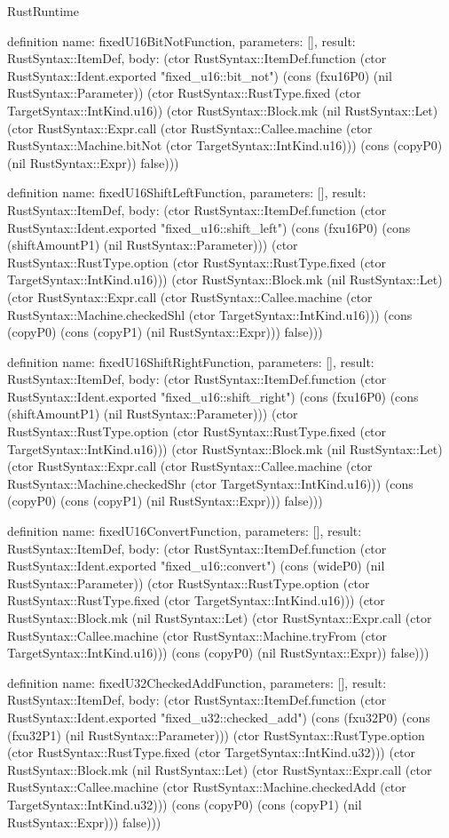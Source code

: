 \begin{lexlean}{RustRuntime}
\begin{semanticmodule}
definition{
  name: fixedU16BitNotFunction,
  parameters: [],
  result: RustSyntax::ItemDef,
  body: (ctor RustSyntax::ItemDef.function (ctor RustSyntax::Ident.exported "fixed_u16::bit_not") (cons (fxu16P0) (nil RustSyntax::Parameter)) (ctor RustSyntax::RustType.fixed (ctor TargetSyntax::IntKind.u16)) (ctor RustSyntax::Block.mk (nil RustSyntax::Let) (ctor RustSyntax::Expr.call (ctor RustSyntax::Callee.machine (ctor RustSyntax::Machine.bitNot (ctor TargetSyntax::IntKind.u16))) (cons (copyP0) (nil RustSyntax::Expr)) false)))
}

definition{
  name: fixedU16ShiftLeftFunction,
  parameters: [],
  result: RustSyntax::ItemDef,
  body: (ctor RustSyntax::ItemDef.function (ctor RustSyntax::Ident.exported "fixed_u16::shift_left") (cons (fxu16P0) (cons (shiftAmountP1) (nil RustSyntax::Parameter))) (ctor RustSyntax::RustType.option (ctor RustSyntax::RustType.fixed (ctor TargetSyntax::IntKind.u16))) (ctor RustSyntax::Block.mk (nil RustSyntax::Let) (ctor RustSyntax::Expr.call (ctor RustSyntax::Callee.machine (ctor RustSyntax::Machine.checkedShl (ctor TargetSyntax::IntKind.u16))) (cons (copyP0) (cons (copyP1) (nil RustSyntax::Expr))) false)))
}

definition{
  name: fixedU16ShiftRightFunction,
  parameters: [],
  result: RustSyntax::ItemDef,
  body: (ctor RustSyntax::ItemDef.function (ctor RustSyntax::Ident.exported "fixed_u16::shift_right") (cons (fxu16P0) (cons (shiftAmountP1) (nil RustSyntax::Parameter))) (ctor RustSyntax::RustType.option (ctor RustSyntax::RustType.fixed (ctor TargetSyntax::IntKind.u16))) (ctor RustSyntax::Block.mk (nil RustSyntax::Let) (ctor RustSyntax::Expr.call (ctor RustSyntax::Callee.machine (ctor RustSyntax::Machine.checkedShr (ctor TargetSyntax::IntKind.u16))) (cons (copyP0) (cons (copyP1) (nil RustSyntax::Expr))) false)))
}

definition{
  name: fixedU16ConvertFunction,
  parameters: [],
  result: RustSyntax::ItemDef,
  body: (ctor RustSyntax::ItemDef.function (ctor RustSyntax::Ident.exported "fixed_u16::convert") (cons (wideP0) (nil RustSyntax::Parameter)) (ctor RustSyntax::RustType.option (ctor RustSyntax::RustType.fixed (ctor TargetSyntax::IntKind.u16))) (ctor RustSyntax::Block.mk (nil RustSyntax::Let) (ctor RustSyntax::Expr.call (ctor RustSyntax::Callee.machine (ctor RustSyntax::Machine.tryFrom (ctor TargetSyntax::IntKind.u16))) (cons (copyP0) (nil RustSyntax::Expr)) false)))
}

definition{
  name: fixedU32CheckedAddFunction,
  parameters: [],
  result: RustSyntax::ItemDef,
  body: (ctor RustSyntax::ItemDef.function (ctor RustSyntax::Ident.exported "fixed_u32::checked_add") (cons (fxu32P0) (cons (fxu32P1) (nil RustSyntax::Parameter))) (ctor RustSyntax::RustType.option (ctor RustSyntax::RustType.fixed (ctor TargetSyntax::IntKind.u32))) (ctor RustSyntax::Block.mk (nil RustSyntax::Let) (ctor RustSyntax::Expr.call (ctor RustSyntax::Callee.machine (ctor RustSyntax::Machine.checkedAdd (ctor TargetSyntax::IntKind.u32))) (cons (copyP0) (cons (copyP1) (nil RustSyntax::Expr))) false)))
}


\end{semanticmodule}
\end{lexlean}
